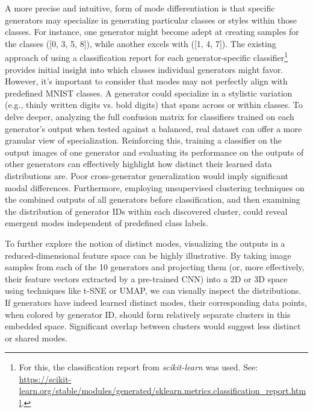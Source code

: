 A more precise and intuitive, form of mode differentiation is that specific generators may specialize in generating particular classes or styles within those classes. For instance, one generator might become adept at creating samples for the classes ([0, 3, 5, 8]), while another excels with ([1, 4, 7]). The existing approach of using a classification report for each generator-specific classifier\footnote{For this, the classification report from \textit{scikit-learn} was used. See: \url{https://scikit-learn.org/stable/modules/generated/sklearn.metrics.classification_report.html}.} provides initial insight into which classes individual generators might favor. However, it's important to consider that modes may not perfectly align with predefined MNIST classes. A generator could specialize in a stylistic variation (e.g., thinly written digits vs. bold digits) that spans across or within classes. To delve deeper, analyzing the full confusion matrix for classifiers trained on each generator's output when tested against a balanced, real dataset can offer a more granular view of specialization. Reinforcing this, training a classifier on the output images of one generator and evaluating its performance on the outputs of other generators can effectively highlight how distinct their learned data distributions are. Poor cross-generator generalization would imply significant modal differences. Furthermore, employing unsupervised clustering techniques on the combined outputs of all generators before classification, and then examining the distribution of generator IDs within each discovered cluster, could reveal emergent modes independent of predefined class labels.

To further explore the notion of distinct modes, visualizing the outputs in a reduced-dimensional feature space can be highly illustrative. By taking image samples from each of the 10 generators and projecting them (or, more effectively, their feature vectors extracted by a pre-trained CNN) into a 2D or 3D space using techniques like t-SNE or UMAP, we can visually inspect the distributions. If generators have indeed learned distinct modes, their corresponding data points, when colored by generator ID, should form relatively separate clusters in this embedded space. Significant overlap between clusters would suggest less distinct or shared modes.

